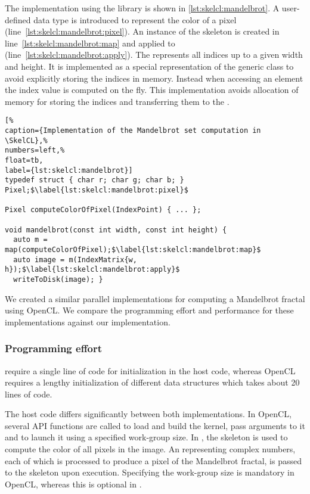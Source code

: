 The implementation using the \SkelCL library is shown in \autoref{lst:skelcl:mandelbrot}.
A user-defined data type is introduced to represent the color of a pixel (line~\ref{lst:skelcl:mandelbrot:pixel}).
An instance of the \map skeleton is created in line~\ref{lst:skelcl:mandelbrot:map} and applied to  (line~\ref{lst:skelcl:mandelbrot:apply}).
The  represents all indices up to a given width and height.
It is implemented as a special representation of the generic  class to avoid explicitly storing the indices in memory.
Instead when accessing an element the index value is computed on the fly.
This implementation avoids allocation of memory for storing the indices and transferring them to the \GPU.


\begin{lstlisting}[%                                                             
caption={Implementation of the Mandelbrot set computation in \SkelCL},%
numbers=left,%
float=tb,
label={lst:skelcl:mandelbrot}]
typedef struct { char r; char g; char b; } Pixel;$\label{lst:skelcl:mandelbrot:pixel}$

Pixel computeColorOfPixel(IndexPoint) { ... };

void mandelbrot(const int width, const int height) {
  auto m = map(computeColorOfPixel);$\label{lst:skelcl:mandelbrot:map}$
  auto image = m(IndexMatrix{w, h});$\label{lst:skelcl:mandelbrot:apply}$
  writeToDisk(image); }
\end{lstlisting}

We created a similar parallel implementations for computing a Mandelbrot fractal using OpenCL.
We compare the programming effort and performance for these implementations against our \SkelCL implementation.

\subsubsection*{Programming effort}
\label{sec:mandelbrot:programming}

\SkelCL require a single line of code for initialization in the host code, whereas OpenCL requires a lengthy initialization of different data structures which takes about 20 lines of code.

The host code differs significantly between both implementations.
In OpenCL, several API functions are called to load and build the kernel, pass arguments to it and to launch it using a specified work-group size.
In \SkelCL, the \map skeleton is used to compute the color of all pixels in the image.
An  representing complex numbers, each of which is processed to produce a pixel of the Mandelbrot fractal, is passed to the \map skeleton upon execution.
Specifying the work-group size is mandatory in OpenCL, whereas this is optional in \SkelCL.

